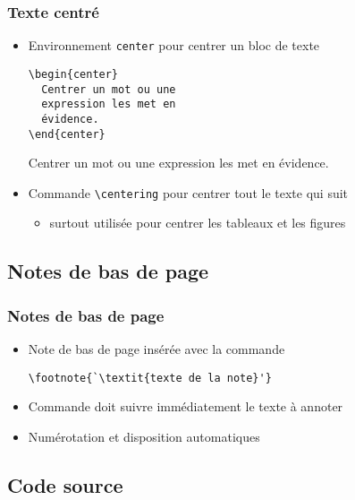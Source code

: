 \begin{frame}[fragile=singleslide]
  \frametitle{Texte centré}

  \begin{itemize}
  \item Environnement \texttt{center} pour centrer un bloc de texte
    \begin{demo}
      \begin{eqxample}
\begin{lstlisting}
\begin{center}
  Centrer un mot ou une
  expression les met en
  évidence.
\end{center}
\end{lstlisting}
        \producing
        \begin{center}
          Centrer un mot ou une expression
          les met en évidence.
        \end{center}
      \end{eqxample}
    \end{demo}
  \item Commande \verb=\centering= pour centrer tout le texte qui suit
    \begin{itemize}
    \item surtout utilisée pour centrer les tableaux et les figures
    \end{itemize}
  \end{itemize}
\end{frame}

\subsection{Notes de bas de page}

\begin{frame}[fragile]
  \frametitle{Notes de bas de page}
  \begin{itemize}
  \item Note de bas de page insérée avec la commande
\begin{lstlisting}
\footnote{`\textit{texte de la note}'}
\end{lstlisting}
  \item Commande doit suivre immédiatement le texte à annoter
  \item Numérotation et disposition automatiques
  \end{itemize}
\end{frame}

\subsection{Code source}

